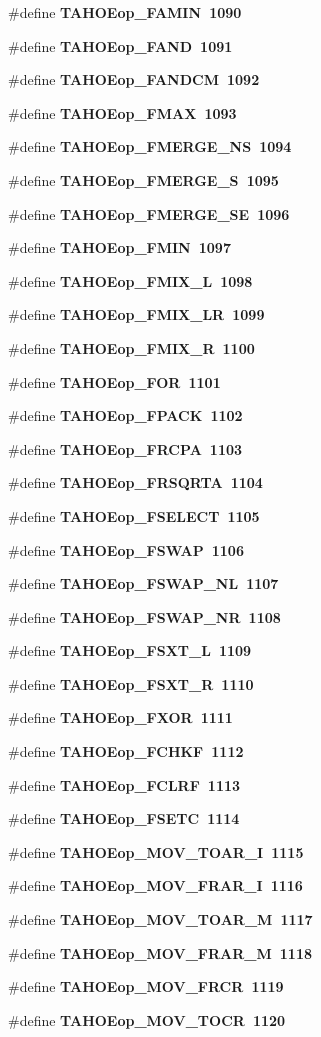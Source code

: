 \begin{CompactItemize}
\#define \bf{TAHOEop\_\-FAMIN}~1090
\item 
\#define \bf{TAHOEop\_\-FAND}~1091
\item 
\#define \bf{TAHOEop\_\-FANDCM}~1092
\item 
\#define \bf{TAHOEop\_\-FMAX}~1093
\item 
\#define \bf{TAHOEop\_\-FMERGE\_\-NS}~1094
\item 
\#define \bf{TAHOEop\_\-FMERGE\_\-S}~1095
\item 
\#define \bf{TAHOEop\_\-FMERGE\_\-SE}~1096
\item 
\#define \bf{TAHOEop\_\-FMIN}~1097
\item 
\#define \bf{TAHOEop\_\-FMIX\_\-L}~1098
\item 
\#define \bf{TAHOEop\_\-FMIX\_\-LR}~1099
\item 
\#define \bf{TAHOEop\_\-FMIX\_\-R}~1100
\item 
\#define \bf{TAHOEop\_\-FOR}~1101
\item 
\#define \bf{TAHOEop\_\-FPACK}~1102
\item 
\#define \bf{TAHOEop\_\-FRCPA}~1103
\item 
\#define \bf{TAHOEop\_\-FRSQRTA}~1104
\item 
\#define \bf{TAHOEop\_\-FSELECT}~1105
\item 
\#define \bf{TAHOEop\_\-FSWAP}~1106
\item 
\#define \bf{TAHOEop\_\-FSWAP\_\-NL}~1107
\item 
\#define \bf{TAHOEop\_\-FSWAP\_\-NR}~1108
\item 
\#define \bf{TAHOEop\_\-FSXT\_\-L}~1109
\item 
\#define \bf{TAHOEop\_\-FSXT\_\-R}~1110
\item 
\#define \bf{TAHOEop\_\-FXOR}~1111
\item 
\#define \bf{TAHOEop\_\-FCHKF}~1112
\item 
\#define \bf{TAHOEop\_\-FCLRF}~1113
\item 
\#define \bf{TAHOEop\_\-FSETC}~1114
\item 
\#define \bf{TAHOEop\_\-MOV\_\-TOAR\_\-I}~1115
\item 
\#define \bf{TAHOEop\_\-MOV\_\-FRAR\_\-I}~1116
\item 
\#define \bf{TAHOEop\_\-MOV\_\-TOAR\_\-M}~1117
\item 
\#define \bf{TAHOEop\_\-MOV\_\-FRAR\_\-M}~1118
\item 
\#define \bf{TAHOEop\_\-MOV\_\-FRCR}~1119
\item 
\#define \bf{TAHOEop\_\-MOV\_\-TOCR}~1120

\end{CompactItemize}
